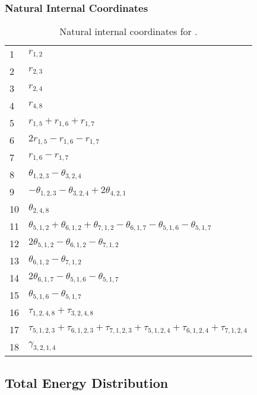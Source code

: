\documentclass[10pt,oneside]{article}
\begin{document}
\begin{table}[h!]
\subsubsection*{Natural Internal Coordinates}
\centering
\caption{Natural internal coordinates for .}
\small
\begin{tabular}{ll}
\toprule
  1   & $r_{1,2}$ \\
  2   & $r_{2,3}$ \\
  3   & $r_{2,4}$ \\
  4   & $r_{4,8}$ \\
  5   & $r_{1,5} + r_{1,6} + r_{1,7}$ \\
  6   & $2r_{1,5} - r_{1,6} - r_{1,7}$ \\
  7   & $r_{1,6} - r_{1,7}$ \\
  8   & $\theta_{1,2,3} - \theta_{3,2,4}$ \\
  9   & $-\theta_{1,2,3} - \theta_{3,2,4} + 2\theta_{4,2,1}$ \\
  10  & $\theta_{2,4,8}$ \\
  11  & $\theta_{5,1,2} + \theta_{6,1,2} + \theta_{7,1,2} - \theta_{6,1,7} - \theta_{5,1,6} - \theta_{5,1,7}$ \\
  12  & $2\theta_{5,1,2} - \theta_{6,1,2} - \theta_{7,1,2}$ \\
  13  & $\theta_{6,1,2} - \theta_{7,1,2}$ \\
  14  & $2\theta_{6,1,7} - \theta_{5,1,6} - \theta_{5,1,7}$ \\
  15  & $\theta_{5,1,6} - \theta_{5,1,7}$ \\
  16  & $\tau_{1,2,4,8} + \tau_{3,2,4,8}$ \\
  17  & $\tau_{5,1,2,3} + \tau_{6,1,2,3} + \tau_{7,1,2,3} + \tau_{5,1,2,4} + \tau_{6,1,2,4} + \tau_{7,1,2,4}$ \\
  18  & $\gamma_{3,2,1,4}$ \\
\bottomrule
\end{tabular}
\end{table}

\begin{table}
\subsection*{Total Energy Distribution}
\centering\end{table}

\clearpage

\subsection{}
\end{document}
